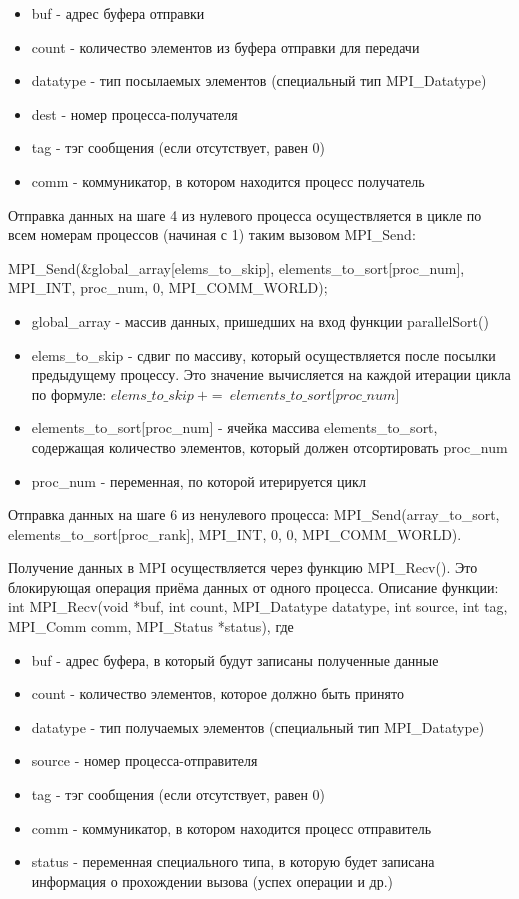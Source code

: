 \documentclass[]{article}
\begin{document}
\begin{itemize}
\item
  buf - адрес буфера отправки
\item
  count - количество элементов из буфера отправки для передачи
\item
  datatype - тип посылаемых элементов (специальный тип MPI\_Datatype)
\item
  dest - номер процесса-получателя
\item
  tag - тэг сообщения (если отсутствует, равен 0)
\item
  comm - коммуникатор, в котором находится процесс получатель
\end{itemize}

Отправка данных на шаге 4 из нулевого процесса осуществляется в цикле по
всем номерам процессов (начиная с 1) таким вызовом MPI\_Send:

MPI\_Send(\&global\_array{[}elems\_to\_skip{]},
elements\_to\_sort{[}proc\_num{]}, MPI\_INT, proc\_num, 0,
MPI\_COMM\_WORLD);

\begin{itemize}
\item
  global\_array - массив данных, пришедших на вход функции
  parallelSort()
\item
  elems\_to\_skip - сдвиг по массиву, который осуществляется после
  посылки предыдущему процессу. Это значение вычисляется на каждой
  итерации цикла по формуле:
  \(elems\_ to\_ skip\  + = \ elements\_ to\_ sort\lbrack proc\_ num\rbrack\)
\item
  elements\_to\_sort{[}proc\_num{]} - ячейка массива elements\_to\_sort,
  содержащая количество элементов, который должен отсортировать
  proc\_num
\item
  proc\_num - переменная, по которой итерируется цикл
\end{itemize}

Отправка данных на шаге 6 из ненулевого процесса:
MPI\_Send(array\_to\_sort, elements\_to\_sort{[}proc\_rank{]}, MPI\_INT,
0, 0, MPI\_COMM\_WORLD).

Получение данных в MPI осуществляется через функцию MPI\_Recv(). Это
блокирующая операция приёма данных от одного процесса. Описание функции:
int MPI\_Recv(void *buf, int count, MPI\_Datatype datatype, int source,
int tag, MPI\_Comm comm, MPI\_Status *status), где

\begin{itemize}
\item
  buf - адрес буфера, в который будут записаны полученные данные
\item
  count - количество элементов, которое должно быть принято
\item
  datatype - тип получаемых элементов (специальный тип MPI\_Datatype)
\item
  source - номер процесса-отправителя
\item
  tag - тэг сообщения (если отсутствует, равен 0)
\item
  comm - коммуникатор, в котором находится процесс отправитель
\item
  status - переменная специального типа, в которую будет записана
  информация о прохождении вызова (успех операции и др.)
\end{itemize}
\end{document}
